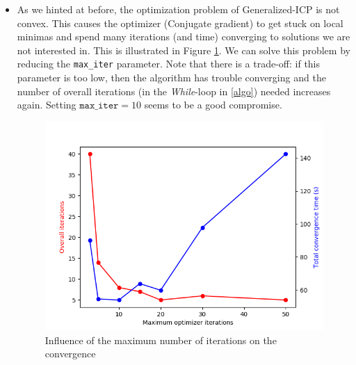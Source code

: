 \documentclass[11pt,letterpaper,leqno]{article}
\begin{document}
\begin{itemize}
    \item As we hinted at before, the optimization problem of Generalized-ICP is not convex. This causes the optimizer (Conjugate gradient) to get stuck on local minimas and spend many iterations (and time) converging to solutions we are not interested in. This is illustrated in Figure \ref{fig:maxiter}. We can solve this problem by reducing the \texttt{max\_iter} parameter. Note that there is a trade-off: if this parameter is too low, then the algorithm has trouble converging and the number of overall iterations (in the \textit{While}-loop in \autoref{algo}) needed increases again. Setting $\texttt{max\_iter}=10$ seems to be a good compromise.
    \begin{figure}[ht!]
        \centering
        \includegraphics[width=0.6\linewidth]{img/maxiter.png}
        \caption{Influence of the maximum number of iterations on the convergence}
        \label{fig:maxiter}
    \end{figure}


\end{itemize}
\end{document}
